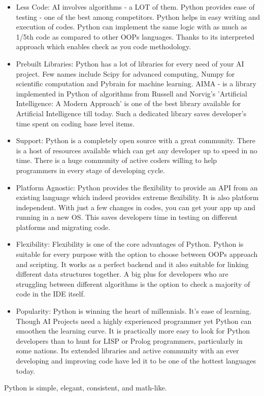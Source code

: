 \begin{itemize}
    \item Less Code: AI involves algorithms - a LOT of them. Python provides ease of testing -  one of the best among competitors. Python helps in easy writing and execution of codes. Python can implement the same logic with as much as 1/5th code as compared to other OOPs languages. Thanks to its interpreted approach which enables check as you code methodology.
    \item Prebuilt Libraries: Python has a lot of libraries for every need of your AI project. Few names include Scipy for advanced computing, Numpy for scientific computation and Pybrain for machine learning. AIMA - is a library implemented in Python of algorithms from Russell and Norvig's 'Artificial Intelligence: A Modern Approach' is one of the best library available for Artificial Intelligence till today. Such a dedicated library saves developer’s time spent on coding base level items.
    \item Support: Python is a completely open source with a great community. There is a host of resources available which can get any developer up to speed in no time. There is a huge community of active coders willing to help programmers in every stage of developing cycle.
    \item Platform Agnostic: Python provides the flexibility to provide an API from an existing language which indeed provides extreme flexibility. It is also platform independent. With just a few changes in codes, you can get your app up and running in a new OS. This saves developers time in testing on different platforms and migrating code.
    \item Flexibility: Flexibility is one of the core advantages of Python. Python is suitable for every purpose with the option to choose between OOPs approach and scripting. It works as a perfect backend and it also suitable for linking different data structures together. A big plus for developers who are struggling between different algorithms is the option to check a majority of code in the IDE itself.
    \item Popularity: Python is winning the heart of millennials. It's ease of learning. Though AI Projects need a highly experienced programmer yet Python can smoothen the learning curve. It is practically more easy to look for Python developers than to hunt for LISP or Prolog programmers, particularly in some nations. Its extended libraries and active community with an ever developing and improving code have led it to be one of the hottest languages today.
\end{itemize}

Python is simple, elegant, consistent, and math-like.